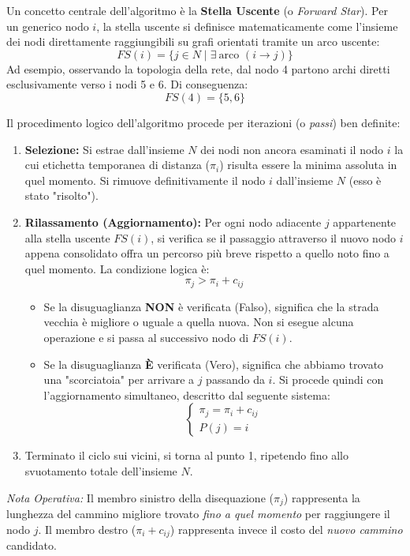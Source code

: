 \documentclass[12pt, a4paper]{article}
\begin{document}
	Un concetto centrale dell'algoritmo è la \textbf{Stella Uscente} (o \textit{Forward Star}).
	Per un generico nodo $i$, la stella uscente si definisce matematicamente come l'insieme dei nodi direttamente raggiungibili su grafi orientati tramite un arco uscente:
	\[
	FS(i) = \{ j \in N \mid \exists \ \text{arco } (i\to j) \}
	\]
	Ad esempio, osservando la topologia della rete, dal nodo 4 partono archi diretti esclusivamente verso i nodi 5 e 6. Di conseguenza:
	\[
	FS(4) = \{ 5, 6 \}
	\]
	
	Il procedimento logico dell'algoritmo procede per iterazioni (o \textit{passi}) ben definite:
	\begin{enumerate}
		\item \textbf{Selezione:} Si estrae dall'insieme $N$ dei nodi non ancora esaminati il nodo $i$ la cui etichetta temporanea di distanza ($\pi_i$) risulta essere la minima assoluta in quel momento. Si rimuove definitivamente il nodo $i$ dall'insieme $N$ (esso è stato "risolto").
		\item \textbf{Rilassamento (Aggiornamento):} Per ogni nodo adiacente $j$ appartenente alla stella uscente $FS(i)$, si verifica se il passaggio attraverso il nuovo nodo $i$ appena consolidato offra un percorso più breve rispetto a quello noto fino a quel momento. La condizione logica è:
		\[
		\pi_j > \pi_i + c_{ij}
		\]
		\begin{itemize}
			\item Se la disuguaglianza \textbf{NON} è verificata (Falso), significa che la strada vecchia è migliore o uguale a quella nuova. Non si esegue alcuna operazione e si passa al successivo nodo di $FS(i)$.
			\item Se la disuguaglianza \textbf{È} verificata (Vero), significa che abbiamo trovato una "scorciatoia" per arrivare a $j$ passando da $i$. Si procede quindi con l'aggiornamento simultaneo, descritto dal seguente sistema:
			\[
			\begin{cases}
				\pi_j = \pi_i + c_{ij} \\
				P(j) = i
			\end{cases}
			\]
		\end{itemize}
		\item Terminato il ciclo sui vicini, si torna al punto 1, ripetendo fino allo svuotamento totale dell'insieme $N$.
	\end{enumerate}
	
	\textit{Nota Operativa:} Il membro sinistro della disequazione ($\pi_j$) rappresenta la lunghezza del cammino migliore trovato \textit{fino a quel momento} per raggiungere il nodo $j$. Il membro destro ($\pi_i + c_{ij}$) rappresenta invece il costo del \textit{nuovo cammino} candidato.
	
\end{document}
